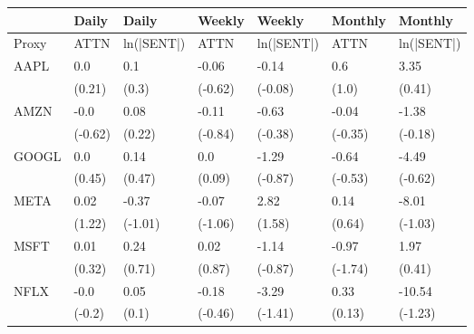 \begin{tabular}{lllllll}
\toprule
{} &    Daily &       Daily &   Weekly &      Weekly &  Monthly &     Monthly \\
\midrule
Proxy &     ATTN &  ln(|SENT|) &     ATTN &  ln(|SENT|) &     ATTN &  ln(|SENT|) \\
AAPL  &      0.0 &         0.1 &    -0.06 &       -0.14 &      0.6 &        3.35 \\
      &   (0.21) &       (0.3) &  (-0.62) &     (-0.08) &    (1.0) &      (0.41) \\
AMZN  &     -0.0 &        0.08 &    -0.11 &       -0.63 &    -0.04 &       -1.38 \\
      &  (-0.62) &      (0.22) &  (-0.84) &     (-0.38) &  (-0.35) &     (-0.18) \\
GOOGL &      0.0 &        0.14 &      0.0 &       -1.29 &    -0.64 &       -4.49 \\
      &   (0.45) &      (0.47) &   (0.09) &     (-0.87) &  (-0.53) &     (-0.62) \\
META  &     0.02 &       -0.37 &    -0.07 &        2.82 &     0.14 &       -8.01 \\
      &   (1.22) &     (-1.01) &  (-1.06) &      (1.58) &   (0.64) &     (-1.03) \\
MSFT  &     0.01 &        0.24 &     0.02 &       -1.14 &    -0.97 &        1.97 \\
      &   (0.32) &      (0.71) &   (0.87) &     (-0.87) &  (-1.74) &      (0.41) \\
NFLX  &     -0.0 &        0.05 &    -0.18 &       -3.29 &     0.33 &      -10.54 \\
      &   (-0.2) &       (0.1) &  (-0.46) &     (-1.41) &   (0.13) &     (-1.23) \\
\bottomrule
\end{tabular}
